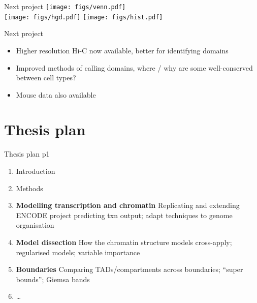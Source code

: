 \documentclass{beamer}
\begin{document}
\begin{frame}{Next project}
\centering
\texttt{[image: figs/venn.pdf]} \\
\texttt{[image: figs/hgd.pdf]}
\texttt{[image: figs/hist.pdf]} 
\end{frame}

\begin{frame}{Next project}
\begin{itemize}
\item Higher resolution Hi-C now available, better for identifying domains
\item Improved methods of calling domains, where / why are some
  well-conserved between cell types?
\item Mouse data also available
\end{itemize}
\end{frame}



\section{Thesis plan}
\begin{frame}{Thesis plan p1}
\begin{enumerate}
\item Introduction
\item Methods
\item {\bf Modelling transcription and chromatin} Replicating and
  extending ENCODE project predicting txn output; adapt techniques to
  genome organisation
\item {\bf Model dissection} How the chromatin structure models
  cross-apply; regularised models; variable importance
\item {\bf Boundaries} Comparing TADs/compartments across boundaries;
  ``super bounds''; Giemsa bands
\item \dots
\end{enumerate}

\end{frame}
\end{document}
